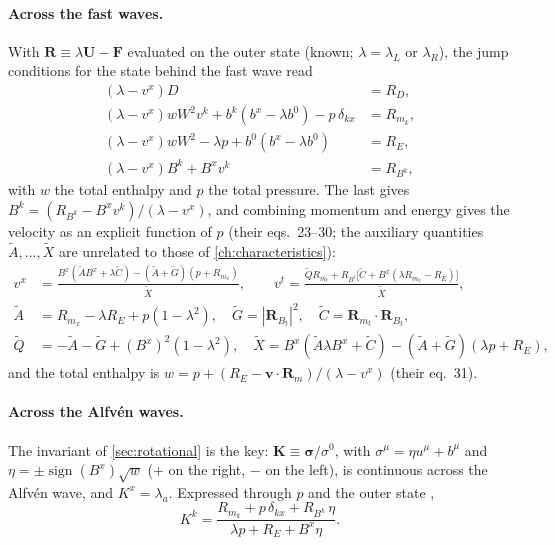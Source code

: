 \documentclass[11pt,a4paper,oneside,openany]{book}
\newcommand{\parencite}{\citep}
\theoremstyle{definition}
\theoremstyle{plain}
\theoremstyle{remark}
\newcommand{\vv}{\bm{v}}
\newcommand{\UU}{\bm{U}}
\newcommand{\FF}{\bm{F}}
\newcommand{\sgn}{\operatorname{sign}}
\begin{document}
\paragraph{Across the fast waves.} With $\bm R\equiv\lambda\UU-\FF$ evaluated on the outer
state (known; $\lambda=\lambda_L$ or $\lambda_R$), the jump conditions for the state behind
the fast wave read \parencite[eqs.~17--20]{MignoneUglianoBodo2009}
\begin{align}
(\lambda-v^x)D&=R_D,\\
(\lambda-v^x)wW^2v^k+b^k(b^x-\lambda b^0)-p\,\delta_{kx}&=R_{m_k},\\
(\lambda-v^x)wW^2-\lambda p+b^0(b^x-\lambda b^0)&=R_E,\\
(\lambda-v^x)B^k+B^xv^k&=R_{B^k},
\end{align}
with $w$ the total enthalpy and $p$ the total pressure. The last gives
$B^k=(R_{B^k}-B^xv^k)/(\lambda-v^x)$, and combining momentum and energy gives the velocity as
an explicit function of $p$ (their eqs.~23--30; the auxiliary quantities $\tilde A,\dots,\tilde X$
are unrelated to those of \cref{ch:characteristics}):
\begin{align}
v^x&=\frac{B^x(\tilde AB^x+\lambda\tilde C)-(\tilde A+\tilde G)(p+R_{m_x})}{\tilde X},\qquad
v^{t}=\frac{\tilde QR_{m_t}+R_{B^t}\bigl[\tilde C+B^x(\lambda R_{m_x}-R_E)\bigr]}{\tilde X},\\
\tilde A&=R_{m_x}-\lambda R_E+p(1-\lambda^2),\quad \tilde G=|\bm R_{B_t}|^2,\quad
\tilde C=\bm R_{m_t}\cdot\bm R_{B_t},\\
\tilde Q&=-\tilde A-\tilde G+(B^x)^2(1-\lambda^2),\quad
\tilde X=B^x(\tilde A\lambda B^x+\tilde C)-(\tilde A+\tilde G)(\lambda p+R_E),
\end{align}
and the total enthalpy is $w=p+(R_E-\vv\cdot\bm R_m)/(\lambda-v^x)$ (their eq.~31).

\paragraph{Across the Alfvén waves.} The invariant of \cref{sec:rotational} is the key:
$\bm K\equiv\bm\sigma/\sigma^0$, with $\sigma^\mu=\eta u^\mu+b^\mu$ and
$\eta=\pm\sgn(B^x)\sqrt w$ ($+$ on the right, $-$ on the left), is continuous across the
Alfvén wave, and $K^x=\lambda_a$. Expressed through $p$ and the outer state
\parencite[eq.~43]{MignoneUglianoBodo2009},
\begin{equation}
K^k=\frac{R_{m_k}+p\,\delta_{kx}+R_{B^k}\,\eta}{\lambda p+R_E+B^x\eta}.
\end{equation}
\end{document}
